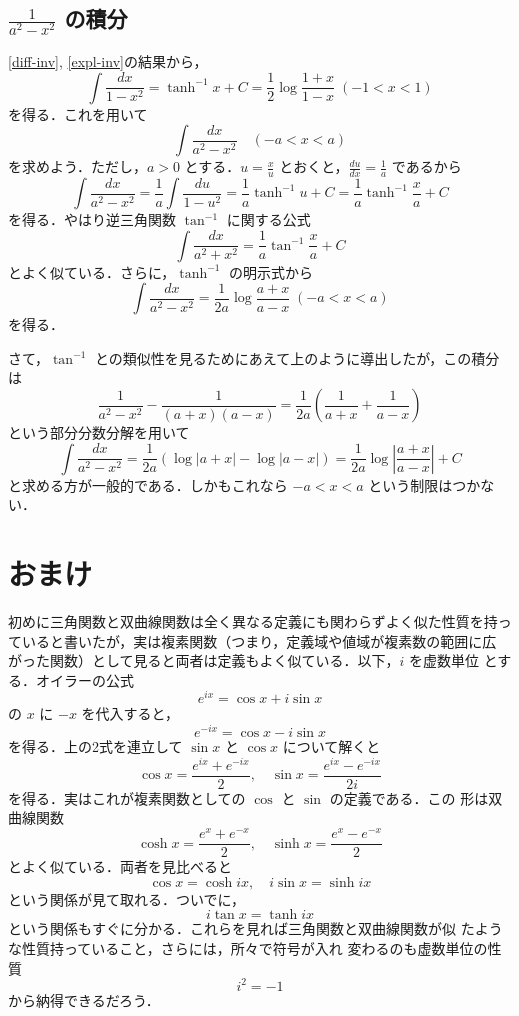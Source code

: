 \documentclass[dvipdfmx,12pt, uplatex]{jsarticle}
\newcommand{\ds}{\displaystyle}
\begin{document}
\subsection{ $\ds \frac{1}{a^2-x^2}$ の積分}

\ref{diff-inv}, \ref{expl-inv}の結果から，
\[
  \int \frac{dx}{1-x^2} = \tanh^{-1} x +C = \frac{1}{2} \log \frac{1+x}{1-x} \; (-1 < x < 1)
\]
を得る．これを用いて
\[
  \int \frac{dx}{a^2-x^2} \quad \left( -a < x < a\right)
\]
を求めよう．ただし，$a>0$ とする．$u=\frac{x}{u}$ とおくと，$\frac{du}{dx} = \frac{1}{a}$ であるから
\[
  \int \frac{dx}{a^2-x^2} = \frac{1}{a} \int \frac{du}{1-u^2}
  = \frac{1}{a} \tanh^{-1} u +C =\frac{1}{a} \tanh^{-1} \frac{x}{a} +C
\]
を得る．やはり逆三角関数 $\tan^{-1}$ に関する公式
\[
  \int \frac{dx}{a^2+x^2} = \frac{1}{a} \tan^{-1} \frac{x}{a} +C
\]
とよく似ている．さらに，$\tanh^{-1}$ の明示式から
\[
  \int \frac{dx}{a^2-x^2} = \frac{1}{2a} \log \frac{a+x}{a-x} \; \left( -a < x < a\right)
\]
を得る．

さて，$\tan^{-1}$ との類似性を見るためにあえて上のように導出したが，この積分は
\[
  \frac{1}{a^2-x^2} - \frac{1}{(a+x)(a-x)} = \frac{1}{2a} \left( \frac{1}{a+x} + \frac{1}{a-x}\right) 
\]
という部分分数分解を用いて
\[
  \int \frac{dx}{a^2-x^2} = \frac{1}{2a}\left( \log | a+x| - \log |a-x| \right) 
  = \frac{1}{2a} \log \left| \frac{a+x}{a-x} \right| +C
\]
と求める方が一般的である．しかもこれなら $ -a < x < a$ という制限はつかない．


\section{おまけ}

初めに三角関数と双曲線関数は全く異なる定義にも関わらずよく似た性質を持っ
ていると書いたが，実は複素関数（つまり，定義域や値域が複素数の範囲に広
がった関数）として見ると両者は定義もよく似ている．以下，$i$ を虚数単位
とする．オイラーの公式
\[
  e^{i x} = \cos x + i \sin x 
\]
の $x$ に $-x$ を代入すると，
\[
  e^{-i x} = \cos x - i \sin x
\]
を得る．上の2式を連立して $\sin x$ と $\cos x$ について解くと
\[
  \cos x = \frac{e^{ix} + e^{-ix}}{2}, \quad \sin x = \frac{e^{ix} - e^{-ix}}{2i}
\]
を得る．実はこれが複素関数としての $\cos$ と $\sin$ の定義である．この
形は双曲線関数
\[
\cosh x = \frac{e^{x} + e^{-x}}{2}, \quad \sinh x = \frac{e^{x} - e^{-x}}{2}
\]
とよく似ている．両者を見比べると
\[
\cos x = \cosh ix, \quad i \sin x = \sinh ix
\]
という関係が見て取れる．ついでに，
\[
  i\tan x = \tanh ix
\]
という関係もすぐに分かる．これらを見れば三角関数と双曲線関数が似
たような性質持っていること，さらには，所々で符号が入れ
変わるのも虚数単位の性質
\[
  i^2 = -1
\]
から納得できるだろう．
\end{document}
